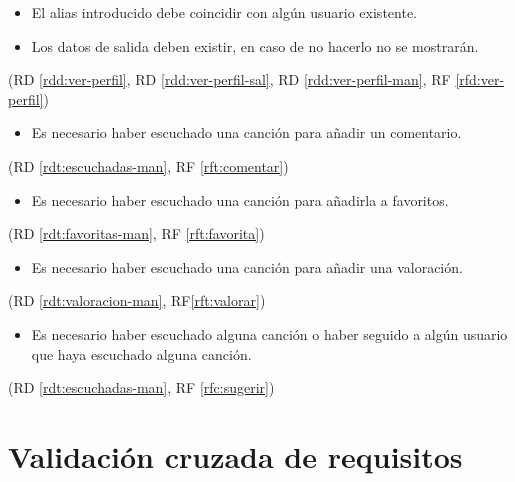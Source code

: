 \begin{itemize}
\item El alias introducido debe coincidir con algún usuario existente.
\item Los datos de salida deben existir, en caso de no hacerlo no se mostrarán.
\end{itemize}
(RD \ref{rdd:ver-perfil}, RD \ref{rdd:ver-perfil-sal}, RD \ref{rdd:ver-perfil-man}, RF \ref{rfd:ver-perfil})


\begin{itemize}
\item Es necesario haber escuchado una canción para añadir un comentario.
\end{itemize}
(RD \ref{rdt:escuchadas-man}, RF \ref{rft:comentar})\label{rst:comentar}

\begin{itemize}
\item Es necesario haber escuchado una canción para añadirla a favoritos.
\end{itemize}
(RD \ref{rdt:favoritas-man}, RF \ref{rft:favorita})\label{rst:favorita}

\begin{itemize}
\item Es necesario haber escuchado una canción para añadir una valoración.
\end{itemize}
(RD \ref{rdt:valoracion-man}, RF\ref{rft:valorar})\label{rst:valorar}


%
\begin{itemize}
\item Es necesario haber escuchado alguna canción o haber seguido a algún usuario que haya escuchado alguna canción.
\end{itemize}
(RD \ref{rdt:escuchadas-man}, RF \ref{rfc:sugerir})

\section{Validación cruzada de requisitos}

